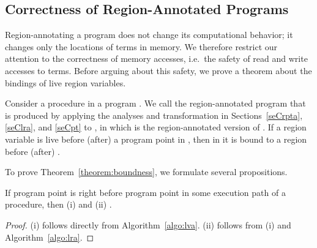 \documentclass{tlp}
\begin{document}
\subsection{Correctness of Region-Annotated Programs}
\label{seCptCcorrectness}

Region-annotating a program does not change its computational behavior;
it changes only the locations of terms in memory.
We therefore restrict our attention to the correctness of memory accesses,
i.e.\ the safety of read and write accesses to terms.
Before arguing about this safety,
we prove a theorem about the bindings of live region variables.

\begin{theorem}
\label{theorem:boundness}
    Consider a procedure  in a program .
    We call  the region-annotated program
    that is produced by applying the analyses and transformation in
    Sections~\ref{seCrpta}, \ref{seClra}, and \ref{seCpt} to ,
    in which  is the region-annotated version of .
    If a region variable is live before (after) a program point  in ,
    then in  it is bound to a region before (after) .
\end{theorem}
To prove Theorem~\ref{theorem:boundness}, we formulate several propositions.
\begin{proposition}
\label{propo:one}
    If program point  is right before program point
     in some execution path of a procedure, then
    (i)  and (ii) .
\end{proposition}
\begin{proof}
    (i) follows directly from Algorithm~\ref{algo:lva}.
    (ii) follows from (i) and Algorithm~\ref{algo:lra}.
\end{proof}
\end{document}
